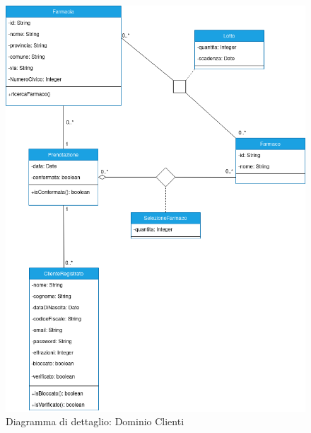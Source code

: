 \begin{figure}[h!]
    \begin{center}
        \includegraphics[scale=0.53]{immagini/DominioCliente-progettazione.png}
        \caption{Diagramma di dettaglio: Dominio Clienti}
    \end{center}
\end{figure}

\newpage

